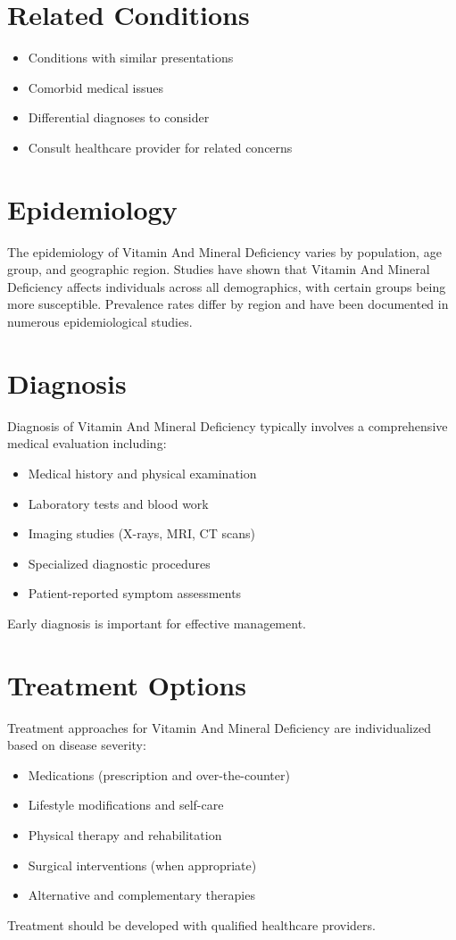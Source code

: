 \section*{Related Conditions}
\begin{itemize}
  \item Conditions with similar presentations
  \item Comorbid medical issues
  \item Differential diagnoses to consider
  \item Consult healthcare provider for related concerns
\end{itemize}

\section*{Epidemiology}
The epidemiology of Vitamin And Mineral Deficiency varies by population, age group, and geographic region. Studies have shown that Vitamin And Mineral Deficiency affects individuals across all demographics, with certain groups being more susceptible. Prevalence rates differ by region and have been documented in numerous epidemiological studies.

\section*{Diagnosis}
Diagnosis of Vitamin And Mineral Deficiency typically involves a comprehensive medical evaluation including:
\begin{itemize}
  \item Medical history and physical examination
  \item Laboratory tests and blood work
  \item Imaging studies (X-rays, MRI, CT scans)
  \item Specialized diagnostic procedures
  \item Patient-reported symptom assessments
\end{itemize}
Early diagnosis is important for effective management.

\section*{Treatment Options}
Treatment approaches for Vitamin And Mineral Deficiency are individualized based on disease severity:
\begin{itemize}
  \item Medications (prescription and over-the-counter)
  \item Lifestyle modifications and self-care
  \item Physical therapy and rehabilitation
  \item Surgical interventions (when appropriate)
  \item Alternative and complementary therapies
\end{itemize}
Treatment should be developed with qualified healthcare providers.

